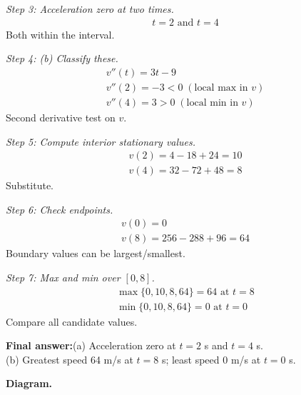 \documentclass[11pt]{article}
\begin{document}
\textit{Step 3: Acceleration zero at two times.}
\[\begin{gathered}
t = 2 \text{ and } t = 4
\end{gathered}\]
Both within the interval.

\textit{Step 4: (b) Classify these.}
\[\begin{gathered}
v''(t) = 3t - 9 \\ v''(2) = -3 < 0\; (\text{local max in } v) \\ v''(4) = 3 > 0\; (\text{local min in } v)
\end{gathered}\]
Second derivative test on \( v \).

\textit{Step 5: Compute interior stationary values.}
\[\begin{gathered}
v(2) = 4 - 18 + 24 = 10 \\ v(4) = 32 - 72 + 48 = 8
\end{gathered}\]
Substitute.

\textit{Step 6: Check endpoints.}
\[\begin{gathered}
v(0) = 0 \\ v(8) = 256 - 288 + 96 = 64
\end{gathered}\]
Boundary values can be largest/smallest.

\textit{Step 7: Max and min over \( [0, 8] \).}
\[\begin{gathered}
\max\{0, 10, 8, 64\} = 64 \text{ at } t = 8 \\ \min\{0, 10, 8, 64\} = 0 \text{ at } t = 0
\end{gathered}\]
Compare all candidate values.

\begin{answerbox}
\textbf{Final answer:}\quad (a) Acceleration zero at \(\displaystyle  t = 2 \) s and \(\displaystyle  t = 4 \) s. \\[3pt]  (b) Greatest speed 64 m/s at \(\displaystyle  t = 8 \) s; least speed 0 m/s at \(\displaystyle  t = 0 \) s.
\end{answerbox}
\textbf{Diagram.}
\end{document}

